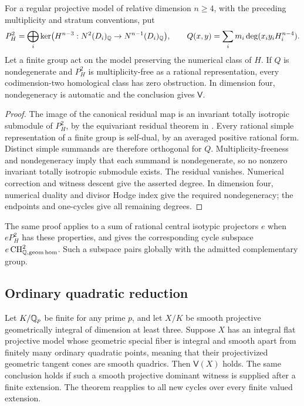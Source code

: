\begin{proposition}\label{prop:symmetry-model}
For a regular projective model of relative dimension $n\geq4$,
with the preceding multiplicity and stratum conventions, put
\[
 P_H^2=\bigoplus_i\ker\bigl(H^{n-3}:N^2(D_i)_\mathbb Q\to
                                    N^{n-1}(D_i)_\mathbb Q\bigr),
 \qquad Q(x,y)=\sum_i m_i\deg(x_iy_iH_i^{n-4}).
\]
Let a finite group act on the model preserving the numerical class
of $H$. If $Q$ is nondegenerate and $P_H^2$ is multiplicity-free
as a rational representation, every codimension-two homological
class has zero obstruction. In dimension four, nondegeneracy is
automatic and the conclusion gives $\mathsf V$.
\end{proposition}

\begin{proof}
The image of the canonical residual map is an invariant totally
isotropic submodule of $P_H^2$, by the equivariant residual theorem
in \cite{InternalModelCriteria}. Every rational simple representation
of a finite group is self-dual, by an averaged positive rational
form. Distinct simple summands are therefore orthogonal for $Q$.
Multiplicity-freeness and nondegeneracy imply that each summand is
nondegenerate, so no nonzero invariant totally isotropic submodule
exists. The residual vanishes. Numerical correction and witness
descent give the asserted degree. In dimension four, numerical
duality and divisor Hodge index give the required nondegeneracy;
the endpoints and one-cycles give all remaining degrees.
\end{proof}

The same proof applies to a sum of rational central isotypic
projectors $e$ when $eP_H^2$ has these properties, and gives the
corresponding cycle subspace $e\operatorname{CH}^2_{\mathbb Q,\mathrm{geom\,hom}}$. Such a
subspace pairs globally with the admitted complementary group.

\subsection{Ordinary quadratic reduction}

\begin{theorem}\label{thm:ordinary}
Let $K/\mathbb Q_p$ be finite for any prime $p$, and let $X/K$ be smooth
projective geometrically integral of dimension at least three.
Suppose $X$ has an integral flat projective model whose geometric
special fiber is integral and smooth apart from finitely many
ordinary quadratic points, meaning that their projectivized
geometric tangent cones are smooth quadrics. Then $\mathsf V(X)$ holds. The same
conclusion holds if such a smooth projective dominant witness is
supplied after a finite extension. The theorem reapplies to all
new cycles over every finite valued extension.
\end{theorem}

